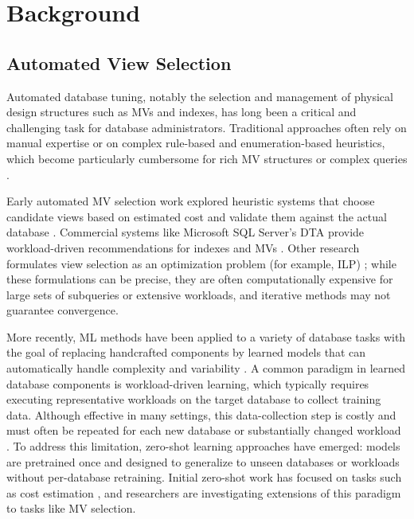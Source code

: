 \chapter{Background}
\label{chap:background}

\section{Automated View Selection}
\label{sec:related_work}

Automated database tuning, notably the selection and management of physical design structures such as \ac{MV}s and indexes, has long been a critical and challenging task for database administrators. Traditional approaches often rely on manual expertise \cite{yuan2020automatic} or on complex rule-based and enumeration-based heuristics, which become particularly cumbersome for rich \ac{MV} structures or complex queries \cite{ahmed2020automated}.

Early automated \ac{MV} selection work explored heuristic systems that choose candidate views based on estimated cost and validate them against the actual database \cite{ahmed2020automated}. Commercial systems like Microsoft SQL Server's \ac{DTA} provide workload-driven recommendations for indexes and \ac{MV}s \cite{ahmed2020automated}. Other research formulates view selection as an optimization problem (for example, \ac{ILP}) \cite{yuan2020automatic}; while these formulations can be precise, they are often computationally expensive for large sets of subqueries or extensive workloads, and iterative methods may not guarantee convergence.

More recently, \ac{ML} methods have been applied to a variety of database tasks with the goal of replacing handcrafted components by learned models that can automatically handle complexity and variability \cite{hilprecht2020learning, kossmann2022swirl}. A common paradigm in learned database components is workload-driven learning, which typically requires executing representative workloads on the target database to collect training data. Although effective in many settings, this data-collection step is costly and must often be repeated for each new database or substantially changed workload \cite{kossmann2022swirl}. To address this limitation, zero-shot learning approaches have emerged: models are pretrained once and designed to generalize to unseen databases or workloads without per-database retraining. Initial zero-shot work has focused on tasks such as cost estimation \cite{sun2019end}, and researchers are investigating extensions of this paradigm to tasks like \ac{MV} selection.

